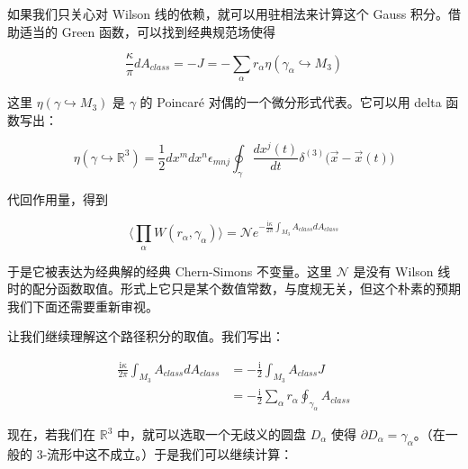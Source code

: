 如果我们只关心对 Wilson 线的依赖，就可以用驻相法来计算这个 Gauss 积分。借助适当的 Green 函数，可以找到经典规范场使得

\begin{equation}
  \frac{\kappa}{\pi}dA_{class}=-J=-\sum_\alpha r_\alpha\eta(\gamma_\alpha\hookrightarrow M_3)
  \tag{2.250}
  \label{eq:2.250}
\end{equation}

这里 $\eta(\gamma\hookrightarrow M_3)$ 是 $\gamma$ 的 Poincaré 对偶的一个微分形式代表。它可以用 delta 函数写出：

\begin{equation}
  \eta(\gamma\hookrightarrow\mathbb{R}^3)=\frac{1}{2}dx^mdx^n\epsilon_{mnj}\oint_\gamma\frac{dx^j(t)}{dt}\delta^{(3)}\big(\vec x-\vec x(t)\big)
  \tag{2.251}
  \label{eq:2.251}
\end{equation}

代回作用量，得到

\begin{equation}
  \Big\langle\prod_\alpha W(r_\alpha,\gamma_\alpha)\Big\rangle
  =\mathcal{N}e^{-\frac{\mathrm{i}\kappa}{2\pi}\int_{M_3}A_{class}dA_{class}}
  \tag{2.252}
  \label{eq:2.252}
\end{equation}

于是它被表达为经典解的经典 Chern-Simons 不变量。这里 $\mathcal{N}$ 是没有 Wilson 线时的配分函数取值。形式上它只是某个数值常数，与度规无关，但这个朴素的预期我们下面还需要重新审视。

让我们继续理解这个路径积分的取值。我们写出：

\begin{equation}
  \begin{aligned}
    \frac{\mathrm{i}\kappa}{2\pi}\int_{M_3}A_{class}dA_{class}
    &=-\frac{\mathrm{i}}{2}\int_{M_3}A_{class}J\\
    &=-\frac{\mathrm{i}}{2}\sum_\alpha r_\alpha\oint_{\gamma_\alpha}A_{class}
  \end{aligned}
  \tag{2.253}
  \label{eq:2.253}
\end{equation}

现在，若我们在 $\mathbb{R}^3$ 中，就可以选取一个无歧义的圆盘 $D_\alpha$ 使得 $\partial D_\alpha=\gamma_\alpha$。（在一般的 $3$-流形中这不成立。）于是我们可以继续计算：

